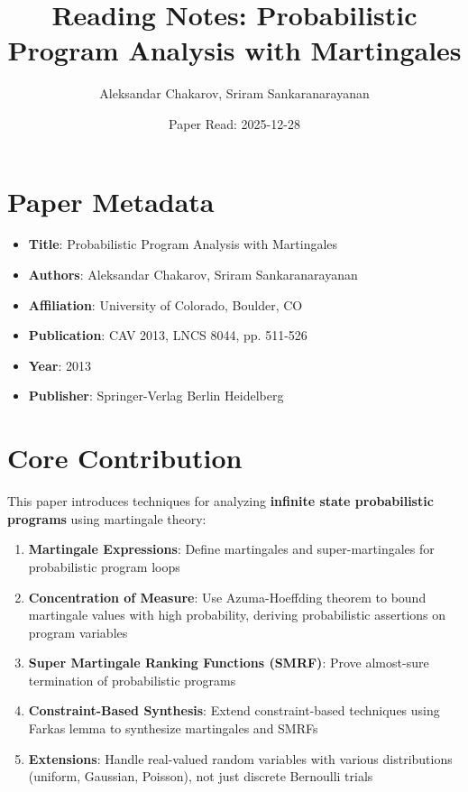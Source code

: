 \documentclass{article}
\title{Reading Notes: Probabilistic Program Analysis with Martingales}
\author{Aleksandar Chakarov, Sriram Sankaranarayanan}
\date{Paper Read: 2025-12-28}
\begin{document}
\maketitle

\section{Paper Metadata}

\begin{itemize}
    \item \textbf{Title}: Probabilistic Program Analysis with Martingales
    \item \textbf{Authors}: Aleksandar Chakarov, Sriram Sankaranarayanan
    \item \textbf{Affiliation}: University of Colorado, Boulder, CO
    \item \textbf{Publication}: CAV 2013, LNCS 8044, pp. 511-526
    \item \textbf{Year}: 2013
    \item \textbf{Publisher}: Springer-Verlag Berlin Heidelberg
\end{itemize}

\section{Core Contribution}

This paper introduces techniques for analyzing \textbf{infinite state probabilistic programs} using martingale theory:

\begin{enumerate}
    \item \textbf{Martingale Expressions}: Define martingales and super-martingales for probabilistic program loops

    \item \textbf{Concentration of Measure}: Use Azuma-Hoeffding theorem to bound martingale values with high probability, deriving probabilistic assertions on program variables

    \item \textbf{Super Martingale Ranking Functions (SMRF)}: Prove almost-sure termination of probabilistic programs

    \item \textbf{Constraint-Based Synthesis}: Extend constraint-based techniques using Farkas lemma to synthesize martingales and SMRFs

    \item \textbf{Extensions}: Handle real-valued random variables with various distributions (uniform, Gaussian, Poisson), not just discrete Bernoulli trials
\end{enumerate}
\end{document}
